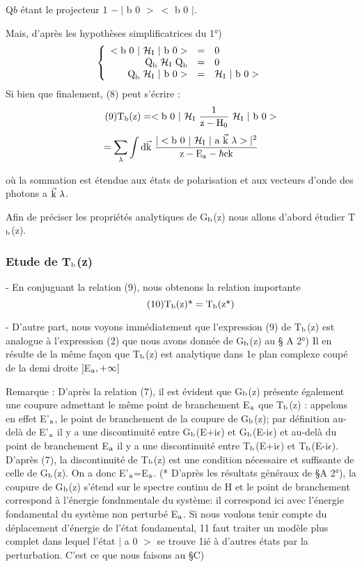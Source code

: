 Q$b$ étant le projecteur 1 $-\ |$ b 0 $>\ <$ b 0 $|$.

Mais, d'après les hypothèses simplificatrices du 1°)
\[
   \left \{
   \begin{array}{r c l}
< \text{b 0 } |\ \mathcal{H}_{\text{I}}\ |\text{ b 0}>  & = & 0 \\
\text{Q}_{\text{b}}\ \mathcal{H}_{\text{I}}\ \text{Q}_{\text{b}} & = & 0 \\
\text{Q}_{\text{b}}\ \mathcal{H}_{\text{I}}\ |\text{ b 0}> & = & \mathcal{H}_{\text{I}}\ |\text{ b 0}>
   \end{array}
   \right .
\]
Si bien que finalement, (8) peut s'écrire :
\[
\tag{9} \mt{T}_\mt{b}\mt{(z)} =
< \mt{b 0 } |\ \mc{H}_\mt{I}\ \frac{1}{\mt{z}-\mt{H}_0}\ \mc{H}_\mt{I}\ |\mt{ b 0}>
\]
\[
=\sum_\lambda\int\mt{d}\vec{\mt{k}}\ 
\frac{|<\mt{b }0\ |\ \mc{H}_\mt{I}\ |\mt{ a }\vec{\mt{k}}\ \lambda> |^2}
{\mt{z}-\mt{E}_\mt{a}-\hbar\mt{ck}}
\]

où la sommation est étendue aux états de polarisation et aux vecteurs d'onde
des photons a $\vec{\mt{k}}\ \lambda$.

Afin de préciser les propriétés analytiques de G$_{\text{b}}$(z) nous allons
d'abord étudier T$_{\text{b}}$(z).

\subsubsection{Etude de T$_{\text{b}}$(z)}%

- En conjuguant la relation (9), nous obtenons la relation
importante
\[
\tag{10} \text{T}_{\text{b}}(\text{z})\text{*}=\text{T}_{\text{b}}(\text{z*})
\]

- D'autre part, nous voyons immédiatement que l'expression
(9) de T$_{\text{b}}$(z) est analogue à l'expression (2) que nous avons donnée de G$_{\text{b}}$(z) au \S
 A 2°) Il en résulte de la même façon que T$_{\text{b}}$(z) est analytique dans 1e plan
complexe coupé de la demi droite $]$E$_{\text{a}}, +\infty ]$

Remarque : D'après la relation (7), il est évident que G$_{\text{b}}$(z) présente également
une coupure admettant le même point de branchement E$_{\text{a}}$ que T$_{\text{b}}$(z) : appelons
en effet E'$_{\text{a}}$, le point de branchement de la coupure de G$_{\text{b}}$(z); par définition
au-delà de E'$_{\text{a}}$ il y a une discontinuité entre G$_{\text{b}}$(E+i$\epsilon$) et G$_{\text{b}}$(E-i$\epsilon$) et
au-delà du point de branchement E$_{\text{a}}$ il y a une discontinuité entre
T$_{\text{b}}$(E+i$\epsilon$) et T$_{\text{b}}$(E-i$\epsilon$). D'après (7), la discontinuité de T$_{\text{b}}$(z) est une
condition nécessaire et suffisante de celle de G$_{\text{b}}$(z). On a donc
E'$_{\text{a}}$=E$_{\text{a}}$. (* D'après les résultats généraux de \S A 2°), la coupure de G$_{\text{b}}$(z) s'étend sur le
spectre continu de H et le point de branchement correspond à l'énergie fondnmentale du système: il correspond ici avec l'énergie fondamental du système non
perturbé E$_{\text{a}}$. Si nous voulons tenir compte du déplacement d'énergie de l'état fondamental, 11 faut traiter un modèle plus complet dans lequel l'état $|$ a 0 $>$ se
trouve 1ié à d'autres états par la perturbation. C'est ce que nous faisons au \S C)

